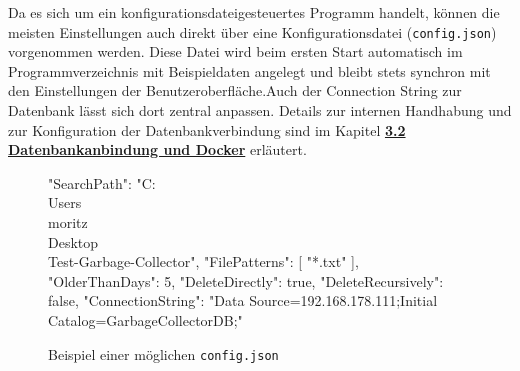 \vspace{1em}
Da es sich um ein konfigurationsdateigesteuertes Programm handelt, können die meisten Einstellungen auch direkt über eine Konfigurationsdatei (\texttt{config.json}) vorgenommen werden. Diese Datei wird beim ersten Start automatisch im Programmverzeichnis mit Beispieldaten angelegt und bleibt stets synchron mit den Einstellungen der Benutzeroberfläche.Auch der Connection String zur Datenbank lässt sich dort zentral anpassen. Details zur internen Handhabung und zur Konfiguration der Datenbankverbindung sind im Kapitel  \hyperref[sec:03_02_datenbankanbindung_und_docker]{\textbf{3.2 Datenbankanbindung und Docker}} erläutert.

\begin{figure}[H]
    \centering
    \begin{jsoncode}
{
  "SearchPath": "C:\\Users\\moritz\\Desktop\\Test-Garbage-Collector",
  "FilePatterns": [
    "*.txt"
  ],
  "OlderThanDays": 5,
  "DeleteDirectly": true,
  "DeleteRecursively": false,
  "ConnectionString": "Data Source=192.168.178.111;Initial Catalog=GarbageCollectorDB;"
}
\end{jsoncode}
    \caption{Beispiel einer möglichen \texttt{config.json}}
\end{figure}

